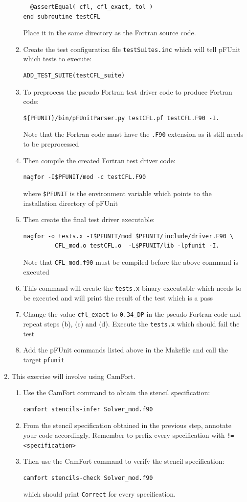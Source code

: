 \documentclass[12pt]{article}
\begin{document}
\begin{enumerate}
\begin{enumerate}
\begin{verbatim}
  @assertEqual( cfl, cfl_exact, tol )
end subroutine testCFL
\end{verbatim}
Place it in the same directory as the Fortran source code.
\item Create the test configuration file \texttt{testSuites.inc} which will tell pFUnit which tests to execute:
\begin{verbatim}
ADD_TEST_SUITE(testCFL_suite)
\end{verbatim}
\item To preprocess the pseudo Fortran test driver code to produce Fortran code:
\begin{verbatim}
${PFUNIT}/bin/pFUnitParser.py testCFL.pf testCFL.F90 -I.
\end{verbatim}
Note that the Fortran code must have the \texttt{.F90} extension as it still needs to be preprocessed
\item Then compile the created Fortran test driver code:
\begin{verbatim}
nagfor -I$PFUNIT/mod -c testCFL.F90
\end{verbatim}
where \texttt{\$PFUNIT} is the environment variable which points to the installation directory of pFUnit
\item Then create the final test driver executable:
\begin{verbatim}
nagfor -o tests.x -I$PFUNIT/mod $PFUNIT/include/driver.F90 \
         CFL_mod.o testCFL.o  -L$PFUNIT/lib -lpfunit -I.
\end{verbatim}
Note that \texttt{CFL\_mod.f90} must be compiled before the above command is executed
\item This command will create the \texttt{tests.x} binary executable which needs to be executed
and will print the result of the test which is a pass
\item Change the value \texttt{cfl\_exact} to \texttt{0.34\_DP} in the pseudo Fortran code and repeat
  steps (b), (c) and (d). Execute the \texttt{tests.x} which should fail the test
\item Add the pFUnit commands listed above in the Makefile and call the target \texttt{pfunit}
\end{enumerate}
\item This exercise will involve using CamFort.
\begin{enumerate}
\item Use the CamFort command to obtain the stencil specification:
\begin{verbatim}
camfort stencils-infer Solver_mod.f90
\end{verbatim}
\item From the stencil specification obtained in the previous step, annotate
  your code accordingly. Remember to prefix every specification with
  \texttt{!= <specification>} 
\item Then use the CamFort command to verify the stencil specification:
\begin{verbatim}
camfort stencils-check Solver_mod.f90
\end{verbatim}
which should print \texttt{Correct} for every specification. 
\end{enumerate}
\end{enumerate}
\end{document}
